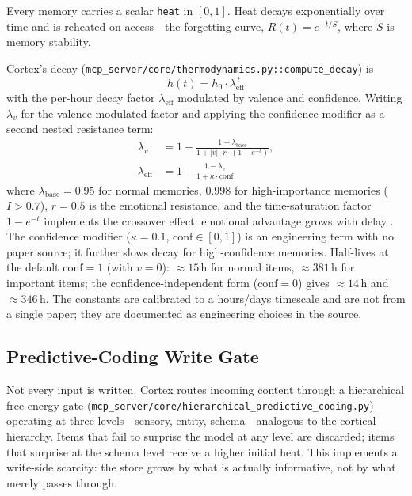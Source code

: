 \documentclass[11pt]{article}
\begin{document}
Every memory carries a scalar \texttt{heat} in $[0, 1]$.  Heat
decays exponentially over time and is reheated on access---the
\citet{Ebbinghaus1885} forgetting curve, $R(t) = e^{-t/S}$, where
$S$ is memory stability.

Cortex's decay
(\texttt{mcp\_server/core/thermodynamics.py::compute\_decay}) is
\begin{equation}
h(t) = h_0 \cdot \lambda_{\mathrm{eff}}^{\,t}
\label{eq:heat-decay}
\end{equation}
with the per-hour decay factor $\lambda_{\mathrm{eff}}$ modulated by
valence and confidence.  Writing $\lambda_v$ for the
valence-modulated factor and applying the confidence modifier as a
second nested resistance term:
\begin{align}
\lambda_{v} &= 1 - \frac{1 - \lambda_{\mathrm{base}}}
                        {1 + |v| \cdot r \cdot (1 - e^{-t})},
\label{eq:lambda-v}\\[2pt]
\lambda_{\mathrm{eff}} &= 1 - \frac{1 - \lambda_{v}}
                                   {1 + \kappa \cdot \mathrm{conf}}
\label{eq:lambda-eff}
\end{align}
where $\lambda_{\mathrm{base}} = 0.95$ for normal memories,
$0.998$ for high-importance memories ($I > 0.7$), $r = 0.5$ is the
emotional resistance, and the time-saturation factor $1 - e^{-t}$
implements the \citet{Kleinsmith1963} crossover effect: emotional
advantage grows with delay \citep{Yonelinas2015}.  The confidence
modifier ($\kappa = 0.1$, $\mathrm{conf} \in [0,1]$) is an
engineering term with no paper source; it further slows decay for
high-confidence memories.  Half-lives at the default
$\mathrm{conf} = 1$ (with $v = 0$): $\approx 15$\,h for normal
items, $\approx 381$\,h for important items; the
confidence-independent form ($\mathrm{conf} = 0$) gives
$\approx 14$\,h and $\approx 346$\,h.  The constants are calibrated
to a hours/days timescale and are not from a single paper; they are
documented as engineering choices in the source.

\subsection{Predictive-Coding Write Gate}
\label{sec:gate}

Not every input is written.  Cortex routes incoming content
through a hierarchical \citet{Friston2010} free-energy gate
(\texttt{mcp\_server/core/hierarchical\_predictive\_coding.py})
operating at three levels---sensory, entity, schema---analogous to
the cortical hierarchy.  Items that fail to surprise the model at
any level are discarded; items that surprise at the schema level
receive a higher initial heat.  This implements a write-side
scarcity: the store grows by what is actually informative, not by
what merely passes through.
\end{document}
